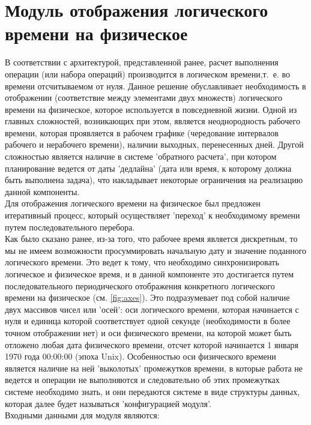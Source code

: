 \section{Модуль отображения логического времени на физическое}
\indent В соответствии с архитектурой, представленной ранее, расчет выполнения операции (или набора операций) производится в логическом времени,т.~е. во времени отсчитываемом от нуля.
Данное решение обуславливает необходимость в отображении (соответствие между элементами двух множеств) логического времени на физическое, которое используется в повседневной жизни.
Одной из главных сложностей, возникающих при этом, является неоднородность рабочего времени, которая проявляется в рабочем графике (чередование интервалов рабочего и нерабочего времени), наличии выходных, перенесенных дней.
Другой сложностью является наличие в системе 'обратного расчета', при котором планирование ведется от даты 'дедлайна' (дата или время, к которому должна быть выполнена задача), что накладывает некоторые ограничения на реализацию данной компоненты.\\
\indent Для отображения логического времени на физическое был предложен итеративный процесс, который осуществляет 'переход' к необходимому времени путем последовательного перебора.\\
\indent Как было сказано ранее, из-за того, что рабочее время является дискретным, то мы не имеем возможности просуммировать начальную дату и значение поданного логического времени.
Это ведет к тому, что необходимо синхронизировать логическое и физическое время, и в данной компоненте это достигается путем последовательного периодического отображения конкретного логического времени на физическое (см. \ref{fig:axes}).
Это подразумевает под собой наличие двух массивов чисел или 'осей': оси логического времени, которая начинается с нуля и единица которой соответствует одной секунде (необходимости в более точном отображении нет) и оси физического времени, на которой может быть отложено любая дата физического времени, отсчет которой начинается 1 января 1970 года 00:00:00 (эпоха Unix).
Особенностью оси физического времени является наличие на ней 'выколотых' промежутков времени, в которые работа не ведется и операции не выполняются и следовательно об этих промежутках системе необходимо знать, и они передаются системе в виде структуры данных, которая далее будет называться 'конфигурацией модуля'.\\
\indent Входными данными для модуля являются:

